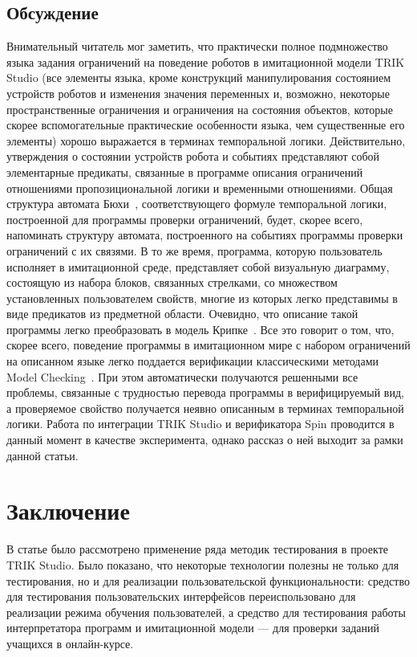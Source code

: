 \documentclass[conference]{IEEEtran}
\begin{document}
\subsection{Обсуждение}
Внимательный читатель мог заметить, что практически полное подмножество языка задания ограничений на поведение 
роботов в имитационной модели TRIK Studio (все элементы языка, кроме конструкций манипулирования состоянием 
устройств роботов и изменения значения переменных и, возможно, некоторые пространственные ограничения и ограничения
на состояния объектов, которые скорее вспомогательные практические особенности языка, чем существенные его элементы) 
хорошо выражается в терминах темпоральной логики. Действительно, утверждения о состоянии устройств робота и 
событиях представляют собой элементарные предикаты, связанные в программе описания ограничений отношениями 
пропозициональной логики и временными отношениями. Общая структура автомата Бюхи~\cite{karpov2010modelchecking}, 
соответствующего формуле темпоральной логики, построенной для программы проверки ограничений, будет, скорее всего, напоминать структуру 
автомата, построенного на событиях программы проверки ограничений с их связями.  В то же время, программа, 
которую пользователь исполняет в имитационной среде, представляет собой визуальную диаграмму, состоящую из 
набора блоков, связанных стрелками, со множеством установленных пользователем свойств, многие из которых легко 
представимы в виде предикатов из предметной области. Очевидно, что описание такой программы легко преобразовать 
в модель Крипке~\cite{karpov2010modelchecking}. Все это говорит о том, что, скорее всего, поведение программы в имитационном мире с набором 
ограничений на описанном языке легко поддается верификации классическими методами Model Checking~\cite{karpov2010modelchecking}. При этом 
автоматически получаются решенными все проблемы, связанные с трудностью перевода программы в верифицируемый 
вид, а проверяемое свойство получается неявно описанным в терминах темпоральной логики. Работа по интеграции 
TRIK Studio и верификатора Spin проводится в данный момент в качестве эксперимента, однако рассказ о ней 
выходит за рамки данной статьи.

\section{Заключение}
В статье было рассмотрено применение ряда методик тестирования в проекте TRIK Studio. Было показано, что 
некоторые технологии полезны не только для тестирования, но и для реализации пользовательской функциональности: 
средство для тестирования пользовательских интерфейсов переиспользовано для реализации режима обучения пользователей, а 
средство для тестирования работы интерпретатора программ и имитационной модели --- для проверки заданий учащихся в онлайн-курсе.
\end{document}
